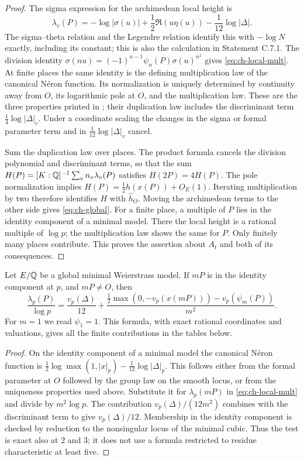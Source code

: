 \begin{proof}
The sigma expression for the archimedean local height is
\[
 \lambda_v(P)=-\log|\sigma(u)|
       +\frac12\Re(u\eta(u))-\frac1{12}\log|\Delta|.
\]
The sigma--theta relation and the Legendre relation identify this
with $-\log N$ exactly, including its constant; this is also the
calculation in Statement C.7.1. The division identity
$\sigma(nu)=(-1)^{n-1}\psi_n(P)\sigma(u)^{n^2}$ gives
\eqref{eq:ch-local-mult}. At finite places the same identity is
the defining multiplication law of the canonical N\'eron function.
Its normalization is uniquely determined by continuity away from
$O$, its logarithmic pole at $O$, and the multiplication law.
These are the three properties printed in
\citet[Section 2.1]{demarco2017}; their duplication law includes
the discriminant term $\frac14\log|\Delta|_v$.
Under a coordinate scaling the changes in the sigma or formal
parameter term and in $\frac1{12}\log|\Delta|_v$ cancel.

Sum the duplication law over places. The product formula cancels
the division polynomial and discriminant terms, so that the sum
$H(P)=[K:\mathbb Q]^{-1}\sum_vn_v\lambda_v(P)$ satisfies
$H(2P)=4H(P)$. The pole normalization implies
$H(P)=\frac12h(x(P))+O_E(1)$. Iterating multiplication by two
therefore identifies $H$ with $\widehat h_O$. Moving the
archimedean terms to the other side gives \eqref{eq:ch-global}.
For a finite place, a multiple of $P$ lies in the identity component
of a minimal model. There the local height is a rational multiple
of $\log p$; the multiplication law shows the same for $P$.
Only finitely many places contribute. This proves the assertion
about $A_t$ and both of its consequences.
\end{proof}

\begin{statement}
Let $E/\mathbb Q$ be a global minimal Weierstrass model. If $mP$ is
in the identity component at $p$, and $mP\ne O$, then
\begin{equation}\label{eq:ch-local-exact}
 \frac{\lambda_p(P)}{\log p}
 =\frac{v_p(\Delta)}{12}
   +\frac{\frac12\max(0,-v_p(x(mP)))-v_p(\psi_m(P))}{m^2}.
\end{equation}
For $m=1$ we read $\psi_1=1$. This formula, with exact rational
coordinates and valuations, gives all the finite contributions
in the tables below.
\end{statement}
\begin{proof}
On the identity component of a minimal model the canonical
N\'eron function is
$\frac12\log\max(1,|x|_p)-\frac1{12}\log|\Delta|_p$.
This follows either from the formal parameter at $O$ followed
by the group law on the smooth locus, or from the uniqueness
properties used above. Substitute it for $\lambda_p(mP)$ in
\eqref{eq:ch-local-mult} and divide by $m^2\log p$.
The contribution $v_p(\Delta)/(12m^2)$ combines with the
discriminant term to give $v_p(\Delta)/12$.
Membership in the identity component is checked by reduction
to the nonsingular locus of the minimal cubic. Thus the test is
exact also at $2$ and $3$; it does not use a formula restricted
to residue characteristic at least five.
\end{proof}

